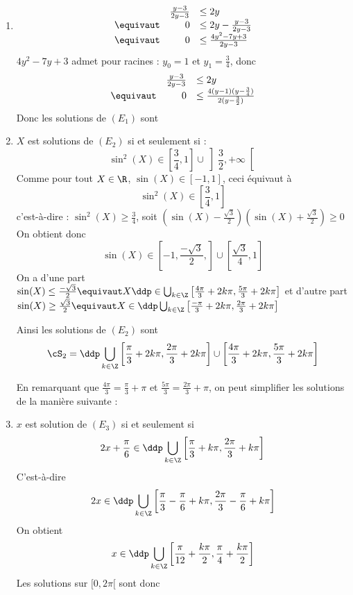\begin{correction}
\begin{enumerate}
\item 
$$\begin{array}{lrl}
&\frac{y-3}{2y-3}&\leq 2y\\
\equivaut &0 &\leq 2y - \frac{y-3}{2y-3}\\
\equivaut &0 &\leq \frac{4y^2-7y+3}{2y-3}
\end{array}$$
$4y^2-7y+3$ admet pour racines : $y_0 = 1$ et $y_1 =\frac{3}{4}$, donc 
$$\begin{array}{lrl}
&\frac{y-3}{2y-3}&\leq 2y\\
\equivaut &0&\leq \frac{4(y-1)(y-\frac{3}{4})}{2(y-\frac{3}{2})}
\end{array}$$
Donc les solutions de $(E_1)$ sont 
\conclusion{ $\cS_1 = \left[ \frac{3}{4}, 1\right] \cup \left] \frac{3}{2}, +\infty\right[ $} 


\item $X$ est solutions de $(E_2)$ si et seulement si : 
$$\sin^2(X) \in \left[ \frac{3}{4}, 1\right] \cup \left] \frac{3}{2}, +\infty\right[ $$
Comme pour tout $X\in \R$,  $\sin(X) \in [-1,1]$, ceci équivaut à 
$$\sin^2(X) \in \left[ \frac{3}{4}, 1\right] $$
c'est-à-dire : $\sin^2(X) \geq \frac{3}{4}$, soit 
$\left(\sin(X) -\frac{\sqrt{3}}{2}\right)\left(\sin(X) +\frac{\sqrt{3}}{2}\right)\geq 0$ 
On obtient donc 
$$\sin(X) \in  \left[ -1, \frac{-\sqrt{3}}{2},\right] \cup  \left[ \frac{\sqrt3}{4}, 1\right] $$
On a  d'une part $\sin(X) \leq  \frac{-\sqrt{3}}{2} \equivaut X \ddp \in \bigcup_{k\in \Z} \left[ \frac{4\pi}{3} +2k\pi,\frac{5\pi}{3} +2k\pi \right] $
et d'autre part 
$\sin(X) \geq  \frac{\sqrt{3}}{2} \equivaut X \in \ddp \bigcup_{k\in \Z} \left[ \frac{-\pi}{3} +2k\pi,\frac{2\pi}{3} +2k\pi \right] $

Ainsi les solutions de $(E_2)$ sont
 $$\cS_2 =\ddp   \bigcup_{k\in \Z} \left[ \frac{\pi}{3} +2k\pi,\frac{2\pi}{3} +2k\pi \right]  \cup \left[ \frac{4\pi}{3} +2k\pi,\frac{5\pi}{3} +2k\pi \right]$$
 
 En remarquant que $ \frac{4\pi}{3} =  \frac{\pi}{3}+\pi$ et 
  $ \frac{5\pi}{3} =  \frac{2\pi}{3}+\pi$, on peut  simplifier les solutions de la manière suivante : 
 

\item $x$ est solution de $(E_3)$ si et seulement si 
$$2x+\frac{\pi}{6}\in \ddp  \bigcup_{k\in \Z} \left[ \frac{\pi}{3} +k\pi,\frac{2\pi}{3} +k\pi \right] $$
C'est-à-dire 
$$2x \in  \ddp  \bigcup_{k\in \Z} \left[ \frac{\pi}{3}- \frac{\pi}{6} +k\pi,\frac{2\pi}{3}-\frac{\pi}{6} +k\pi \right] $$
On obtient 
$$x \in  \ddp  \bigcup_{k\in \Z} \left[ \frac{\pi}{12} +\frac{k\pi}{2},\frac{\pi}{4}+\frac{k\pi}{2}\right] $$
Les solutions sur $[0,2\pi[$ sont donc 


\end{enumerate}
\end{correction}
